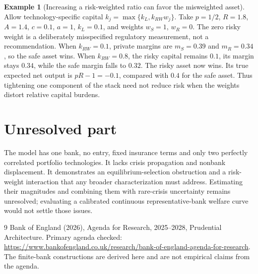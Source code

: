 \documentclass[11pt]{article}
\theoremstyle{definition}
\newtheorem{example}{Example}
\begin{document}
\begin{example}[Increasing a risk-weighted ratio can favor the misweighted asset]
Allow technology-specific capital $k_j=\max\{k_L,k_{RW}w_j\}$. Take $p=1/2$, $R=1.8$, $A=1.4$, $c=0.1$, $a=1$, $k_L=0.1$, and weights $w_S=1$, $w_R=0$. The zero risky weight is a deliberately misspecified regulatory measurement, not a recommendation. When $k_{RW}=0.1$, private margins are $m_S=0.39$ and $m_R=0.34$, so the safe asset wins. When $k_{RW}=0.8$, the risky capital remains $0.1$, its margin stays $0.34$, while the safe margin falls to $0.32$. The risky asset now wins. Its true expected net output is $pR-1=-0.1$, compared with $0.4$ for the safe asset. Thus tightening one component of the stack need not reduce risk when the weights distort relative capital burdens.
\end{example}

\section*{Unresolved part}
The model has one bank, no entry, fixed insurance terms and only two perfectly correlated portfolio technologies. It lacks crisis propagation and nonbank displacement. It demonstrates an equilibrium-selection obstruction and a risk-weight interaction that any broader characterization must address. Estimating their magnitudes and combining them with rare-crisis uncertainty remains unresolved; evaluating a calibrated continuous representative-bank welfare curve would not settle those issues.
\begin{thebibliography}{9}
 Bank of England (2026), Agenda for Research, 2025--2028, Prudential Architecture. Primary agenda checked: \url{https://www.bankofengland.co.uk/research/bank-of-england-agenda-for-research}. The finite-bank constructions are derived here and are not empirical claims from the agenda.
\end{thebibliography}
\end{document}
